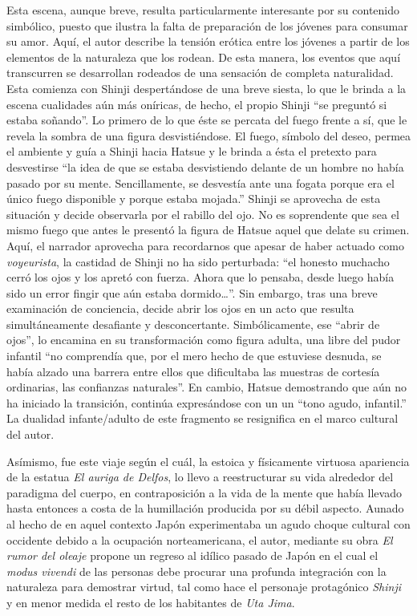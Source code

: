 Esta escena, aunque breve, resulta particularmente interesante por su contenido simbólico, puesto que ilustra la falta de preparación de los jóvenes para consumar su amor.
Aquí, el autor describe la tensión erótica entre los jóvenes a partir de los elementos de la naturaleza que los rodean.
De esta manera, los eventos que aquí transcurren se desarrollan rodeados de una sensación de completa naturalidad.
Esta comienza con Shinji despertándose de una breve siesta, lo que le brinda a la escena cualidades aún más oníricas, de hecho, el propio Shinji ``se preguntó si estaba soñando''.%
Lo primero de lo que éste se percata del fuego frente a sí, que le revela la sombra de una figura desvistiéndose. El fuego, símbolo del deseo, permea el ambiente y guía a Shinji hacia Hatsue y le brinda a ésta el pretexto para desvestirse ``la idea de que se estaba desvistiendo delante de un hombre no había pasado por su mente. Sencillamente, se desvestía ante una fogata porque era el único fuego disponible y porque estaba mojada.''%
Shinji se aprovecha de esta situación y decide observarla por el rabillo del ojo.
No es soprendente que sea el mismo fuego que antes le presentó la figura de Hatsue aquel que delate su crimen.
Aquí, el narrador aprovecha para recordarnos que apesar de haber actuado como \emph{voyeurista}, la castidad de Shinji no ha sido perturbada: ``el honesto muchacho cerró los ojos y los apretó con fuerza. Ahora que lo pensaba, desde luego había sido un error fingir que aún estaba dormido\ldots''.
Sin embargo, tras una breve examinación de conciencia, decide abrir los ojos en un acto que resulta simultáneamente desafiante y desconcertante.
Simbólicamente, ese ``abrir de ojos'', lo encamina en su transformación como figura adulta, una libre del pudor infantil ``no comprendía que, por el mero hecho de que estuviese desnuda, se había alzado una barrera entre ellos que dificultaba las muestras de cortesía ordinarias, las confianzas naturales''.
En cambio, Hatsue demostrando que aún no ha iniciado la transición, continúa expresándose con un un ``tono agudo, infantil.'' La dualidad infante/adulto de este fragmento se resignifica en el marco cultural del autor.

Asímismo, fue este viaje según el cuál, la estoica y físicamente virtuosa apariencia de la estatua \emph{El auriga de Delfos}, lo llevo a reestructurar su vida alrededor del paradigma del cuerpo, en contraposición a la vida de la mente que había llevado hasta entonces a costa de la humillación producida por su débil aspecto. Aunado al hecho de en aquel contexto Japón experimentaba un agudo choque cultural con occidente debido a la ocupación norteamericana, el autor, mediante su obra \emph{El rumor del oleaje} propone un regreso al idílico pasado de Japón en el cual el \emph{modus vivendi} de las personas debe procurar una profunda integración con la naturaleza para demostrar virtud, tal como hace el personaje protagónico \emph{Shinji} y en menor medida el resto de los habitantes de \emph{Uta Jima}. %

